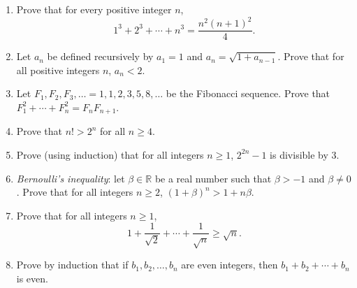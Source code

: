 \begin{enumerate}
\item Prove that for every positive integer $n$,
 $$1^3 + 2^3 + \cdots +n^3 = \frac{n^2(n+1)^2}{4}.$$ 
\item Let $a_n$ be defined recursively by $a_1 = 1$ and $a_n = \sqrt{1 + a_{n-1}}$. Prove that for all positive integers $n$, $a_n < 2$.

 \item Let $F_1, F_2, F_3, \ldots = 1,1,2,3,5,8,\ldots$ be the Fibonacci sequence. Prove that $F_1^2 + \cdots + F_n^2 = F_nF_{n+1}$.
 \item Prove that $n! > 2^n$ for all $n \geq 4$.
   \item Prove (using induction) that for all integers $n \geq 1$, $2^{2n}-1$ is divisible by 3.   
 \item \emph{Bernoulli's inequality}: let $\beta \in \mathbb{R}$ be a real number such that $\beta > -1$ and $\beta \neq 0$. Prove that for all integers $n \geq 2$, $(1 + \beta)^n > 1 + n\beta$.
 \item Prove that for all integers $n \geq 1$,
   \[
1 + \frac{1}{\sqrt{2}} + \cdots + \frac{1}{\sqrt{n}} \geq \sqrt{n}.
     \]

\item Prove by induction that if $b_1, b_2, \ldots , b_n$ are even integers, then $b_1 + b_2 + \cdots + b_n$ is even.     
 \end{enumerate}

